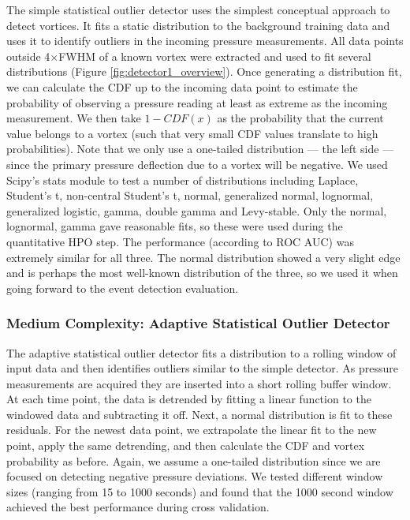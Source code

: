 The simple statistical outlier detector uses the simplest conceptual approach to detect vortices. 
It fits a static distribution to the background training data and uses it to identify outliers in the incoming pressure measurements. 
All data points outside 4$\times$\acrshort{FWHM} of a known vortex were extracted and used to fit several distributions (Figure \ref{fig:detector1_overview}). 
Once generating a distribution fit, we can calculate the \acrfull{CDF} up to the incoming data point to estimate the probability of observing a pressure reading at least as extreme as the incoming measurement. 
We then take $1-CDF(x)$ as the probability that the current value belongs to a vortex (such that very small \acrshort{CDF} values translate to high probabilities).
Note that we only use a one-tailed distribution — the left side — since the primary pressure deflection due to a vortex will be negative. 
We used Scipy’s stats module to test a number of distributions including Laplace, Student’s t, non-central Student's t, normal, generalized normal, lognormal, generalized logistic, gamma, double gamma and Levy-stable. 
Only the normal, lognormal, gamma gave reasonable fits, so these were used during the quantitative \acrshort{HPO} step. 
The performance (according to \acrshort{ROC AUC}) was extremely similar for all three. 
The normal distribution showed a very slight edge and is perhaps the most well-known distribution of the three, so we used it when going forward to the event detection evaluation. 

\subsubsection{Medium Complexity: Adaptive Statistical Outlier Detector}

The adaptive statistical outlier detector fits a distribution to a rolling window of input data and then identifies outliers similar to the simple detector. 
As pressure measurements are acquired they are inserted into a short rolling buffer window. 
At each time point, the data is detrended by fitting a linear function to the windowed data and subtracting it off. 
Next, a normal distribution is fit to these residuals. 
For the newest data point, we extrapolate the linear fit to the new point, apply the same detrending, and then calculate the \acrshort{CDF} and vortex probability as before.
Again, we assume a one-tailed distribution since we are focused on detecting negative pressure deviations. 
We tested different window sizes (ranging from 15 to 1000 seconds) and found that the 1000 second window achieved the best performance during cross validation.


